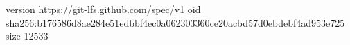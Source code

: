 version https://git-lfs.github.com/spec/v1
oid sha256:b176586d8ae284e51edbbf4ec0a062303360ce20acbd57d0ebdebf4ad953e725
size 12533
